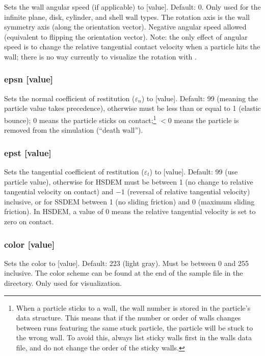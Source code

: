 Sets the wall angular speed (if applicable) to [value].  Default: 0.
Only used for the infinite plane, disk, cylinder, and shell wall
types.  The rotation axis is the wall symmetry axis (\ie along the
orientation vector).  Negative angular speed allowed (equivalent to
flipping the orientation vector).  Note: the only effect of angular
speed is to change the relative tangential contact velocity when a
particle hits the wall; there is no way currently to visualize the
rotation with .

\subsubsection{epsn [value]}

Sets the normal coefficient of restitution ($\varepsilon_n$) to
[value].  Default: 99 (meaning the particle value takes precedence),
otherwise must be less than or equal to 1 (elastic bounce); 0 means
the particle sticks on contact;\footnote{When a particle sticks to a
  wall, the wall number is stored in the particle's data
  structure. This means that if the number or order of walls changes
  between runs featuring the same stuck particle, the particle will be
  stuck to the wrong wall. To avoid this, always list sticky walls
  first in the walls data file, and do not change the order of the
  sticky walls.} $<0$ means the particle is removed from the
simulation (``death wall'').

\subsubsection{epst [value]}

Sets the tangential coefficient of restitution ($\varepsilon_t$) to
[value].  Default: 99 (use particle value), otherwise for HSDEM must
be between 1 (no change to relative tangential velocity on contact)
and $-1$ (reversal of relative tangential velocity) inclusive, or for
SSDEM between 1 (no sliding friction) and 0 (maximum sliding
friction).  In HSDEM, a value of 0 means the relative tangential
velocity is set to zero on contact.

\subsubsection{color [value]}

Sets the color to [value].  Default: 223 (light gray).  Must be
between 0 and 255 inclusive.  The color scheme can be found at the end
of the sample  file in the \pkd\ 
directory.  Only used for visualization.

